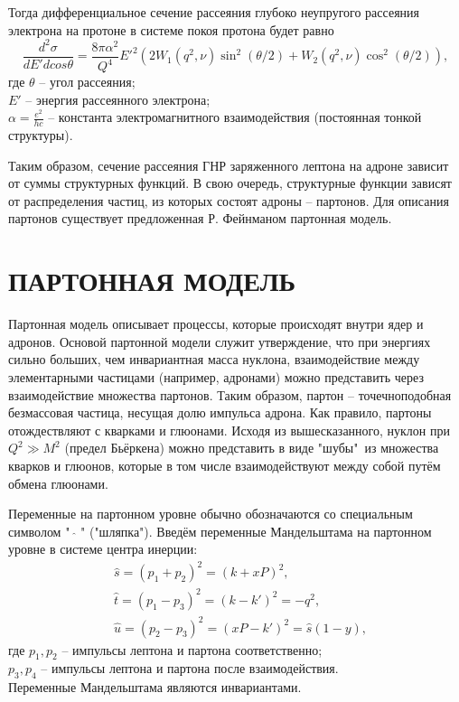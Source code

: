 \documentclass{extreport}
\begin{document}
Тогда дифференциальное сечение рассеяния глубоко неупругого рассеяния электрона на протоне в системе покоя протона будет равно
\begin{equation}
	\frac{d^2\sigma}{dE' d cos\theta} = \frac{8\pi \alpha^2}{Q^4} E'^2 (2W_1(q^2, \nu) \sin^2 (\theta /2) + W_2 (q^2, \nu) \cos^2 (\theta/2)),
\end{equation}
где $\theta$ -- угол рассеяния; \\ $E'$ -- энергия рассеянного электрона; \\ $\alpha = \frac{e^2}{hc}$ -- константа электромагнитного взаимодействия (постоянная тонкой структуры).

Таким образом, сечение рассеяния ГНР заряженного лептона на адроне зависит от суммы структурных функций. В свою очередь, структурные функции зависят от распределения частиц, из которых состоят адроны -- партонов. Для описания партонов существует предложенная Р. Фейнманом партонная модель.
 
\newpage
\chapter{\MakeUppercase{Партонная модель}}
\thispagestyle{myheadings}
Партонная модель описывает процессы, которые происходят внутри ядер и адронов. Основой партонной модели служит утверждение, что при энергиях сильно больших, чем инвариантная масса нуклона, взаимодействие между элементарными частицами (например, адронами) можно представить через взаимодействие множества партонов. Таким образом, партон -- точечноподобная безмассовая частица, несущая долю импульса адрона. Как правило, партоны отождествляют с кварками и глюонами. 
Исходя из вышесказанного, нуклон при $Q^2 \gg M^2$ (предел Бьёркена) можно представить в виде "шубы"\ из множества кварков и глюонов, которые в том числе взаимодействуют между собой путём обмена глюонами.


Переменные на партонном уровне обычно обозначаются со специальным символом "\ $\hat{}$ " ("шляпка"). Введём переменные Мандельштама на партонном уровне в системе центра инерции:
\begin{equation}
\begin{split}
	& \hat{s} = (p_1+p_2)^2 = (k + xP)^2, \\
	& \hat{t} = (p_1-p_3)^2 = (k-k')^2 = -q^2, \\
	& \hat{u} = (p_2-p_3)^2 =(xP-k')^2= \hat{s} (1-y),
\end{split}
\end{equation}
где $p_1, p_2$ -- импульсы лептона и партона соответственно; \\ $p_3, p_4$ -- импульсы лептона и партона после взаимодействия. \\
Переменные Мандельштама являются инвариантами. 
\end{document}
